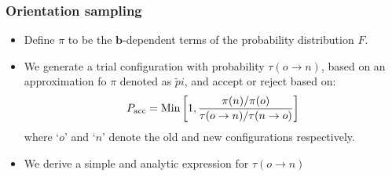 \documentclass[xcolor=svgnames]{beamer}
\DeclareRobustCommand{\mbf}[1]{{\boldsymbol {#1}}}
\begin{document}
        \begin{frame}
            \frametitle{Orientation sampling}
            \begin{itemize}
                \item Define $\pi$ to be the $\mbf{b}$-dependent terms of the probability distribution $F$.
                \item We generate a trial configuration with probability $\tau (o \to n)$, based on an approximation fo $\pi$ denoted as $\tilde pi$, and accept or reject based on:
                \begin{equation*}
                    \label{eq:Pacc}
                    P_{\rm acc} = \text{Min} \left[1, \frac{\pi(n)/\pi(o)}{\tau (o \to n)/\tau (n \to o)} \right]
                \end{equation*}
                where `$o$' and `$n$' denote the old and new configurations respectively.
                \item We derive a simple and analytic expression for $\tau (o \to n)$
            \end{itemize}
        \end{frame}
\end{document}
